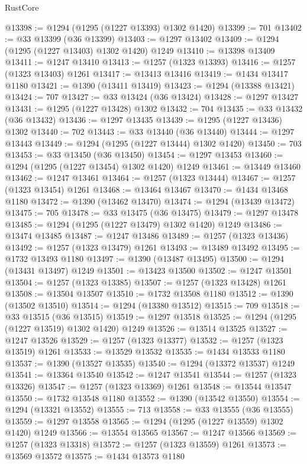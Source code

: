 \begin{lexlean}{RustCore}
\begin{coremodule}
@13398 := @1294 (@1295 (@1227 @13393) @1302 @1420)
@13399 := 701
@13402 := @33 @13399 (@36 @13399)
@13403 := @1297 @13402
@13409 := @1294 (@1295 (@1227 @13403) @1302 @1420) @1249
@13410 := @13398 @13409
@13411 := @1247 @13410
@13413 := @1257 (@1323 @13393)
@13416 := @1257 (@1323 @13403) @1261
@13417 := @13413 @13416
@13419 := @1434 @13417 @1180
@13421 := @1390 (@13411 @13419)
@13423 := @1294 (@13388 @13421)
@13424 := 707
@13427 := @33 @13424 (@36 @13424)
@13428 := @1297 @13427
@13431 := @1295 (@1227 @13428) @1302
@13432 := 704
@13435 := @33 @13432 (@36 @13432)
@13436 := @1297 @13435
@13439 := @1295 (@1227 @13436) @1302
@13440 := 702
@13443 := @33 @13440 (@36 @13440)
@13444 := @1297 @13443
@13449 := @1294 (@1295 (@1227 @13444) @1302 @1420)
@13450 := 703
@13453 := @33 @13450 (@36 @13450)
@13454 := @1297 @13453
@13460 := @1294 (@1295 (@1227 @13454) @1302 @1420) @1249
@13461 := @13449 @13460
@13462 := @1247 @13461
@13464 := @1257 (@1323 @13444)
@13467 := @1257 (@1323 @13454) @1261
@13468 := @13464 @13467
@13470 := @1434 @13468 @1180
@13472 := @1390 (@13462 @13470)
@13474 := @1294 (@13439 @13472)
@13475 := 705
@13478 := @33 @13475 (@36 @13475)
@13479 := @1297 @13478
@13485 := @1294 (@1295 (@1227 @13479) @1302 @1420) @1249
@13486 := @13474 @13485
@13487 := @1247 @13486
@13489 := @1257 (@1323 @13436)
@13492 := @1257 (@1323 @13479) @1261
@13493 := @13489 @13492
@13495 := @1732 @13493 @1180
@13497 := @1390 (@13487 @13495)
@13500 := @1294 (@13431 @13497) @1249
@13501 := @13423 @13500
@13502 := @1247 @13501
@13504 := @1257 (@1323 @13385)
@13507 := @1257 (@1323 @13428) @1261
@13508 := @13504 @13507
@13510 := @1732 @13508 @1180
@13512 := @1390 (@13502 @13510)
@13514 := @1294 (@13380 @13512)
@13515 := 709
@13518 := @33 @13515 (@36 @13515)
@13519 := @1297 @13518
@13525 := @1294 (@1295 (@1227 @13519) @1302 @1420) @1249
@13526 := @13514 @13525
@13527 := @1247 @13526
@13529 := @1257 (@1323 @13377)
@13532 := @1257 (@1323 @13519) @1261
@13533 := @13529 @13532
@13535 := @1434 @13533 @1180
@13537 := @1390 (@13527 @13535)
@13540 := @1294 (@13372 @13537) @1249
@13541 := @13364 @13540
@13542 := @1247 @13541
@13544 := @1257 (@1323 @13326)
@13547 := @1257 (@1323 @13369) @1261
@13548 := @13544 @13547
@13550 := @1732 @13548 @1180
@13552 := @1390 (@13542 @13550)
@13554 := @1294 (@13321 @13552)
@13555 := 713
@13558 := @33 @13555 (@36 @13555)
@13559 := @1297 @13558
@13565 := @1294 (@1295 (@1227 @13559) @1302 @1420) @1249
@13566 := @13554 @13565
@13567 := @1247 @13566
@13569 := @1257 (@1323 @13318)
@13572 := @1257 (@1323 @13559) @1261
@13573 := @13569 @13572
@13575 := @1434 @13573 @1180

\end{coremodule}
\end{lexlean}
